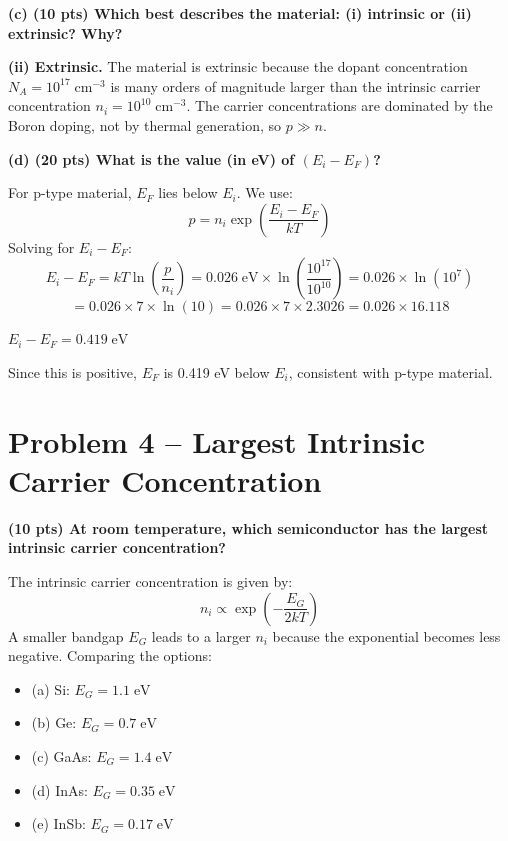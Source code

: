 \documentclass[11pt]{article}
\begin{document}
\textbf{(c) (10 pts) Which best describes the material: (i) intrinsic or (ii) extrinsic? Why?}

\begin{answerbox}
  \textbf{(ii) Extrinsic.} The material is extrinsic because the dopant concentration $N_A = 10^{17}\;\text{cm}^{-3}$ is many orders of magnitude larger than the intrinsic carrier concentration $n_i = 10^{10}\;\text{cm}^{-3}$. The carrier concentrations are dominated by the Boron doping, not by thermal generation, so $p \gg n$.
\end{answerbox}

\textbf{(d) (20 pts) What is the value (in eV) of $(E_i - E_F)$?}

For p-type material, $E_F$ lies below $E_i$. We use:
\[
  p = n_i \exp\!\left(\frac{E_i - E_F}{kT}\right)
\]
Solving for $E_i - E_F$:
\[
  E_i - E_F = kT \ln\!\left(\frac{p}{n_i}\right)
    = 0.026\;\text{eV} \times \ln\!\left(\frac{10^{17}}{10^{10}}\right)
    = 0.026 \times \ln(10^{7})
\]
\[
  = 0.026 \times 7 \times \ln(10)
  = 0.026 \times 7 \times 2.3026
  = 0.026 \times 16.118
\]

\begin{answerbox}
  $E_i - E_F = 0.419\;\text{eV}$

  Since this is positive, $E_F$ is 0.419 eV below $E_i$, consistent with p-type material.
\end{answerbox}

\newpage

\section*{Problem 4 -- Largest Intrinsic Carrier Concentration}

\textbf{(10 pts) At room temperature, which semiconductor has the largest intrinsic carrier concentration?}

The intrinsic carrier concentration is given by:
\[
  n_i \propto \exp\!\left(-\frac{E_G}{2kT}\right)
\]
A smaller bandgap $E_G$ leads to a larger $n_i$ because the exponential becomes less negative. Comparing the options:
\begin{itemize}[nosep]
  \item (a) Si: $E_G = 1.1\;\text{eV}$
  \item (b) Ge: $E_G = 0.7\;\text{eV}$
  \item (c) GaAs: $E_G = 1.4\;\text{eV}$
  \item (d) InAs: $E_G = 0.35\;\text{eV}$
  \item (e) InSb: $E_G = 0.17\;\text{eV}$
\end{itemize}
\end{document}
